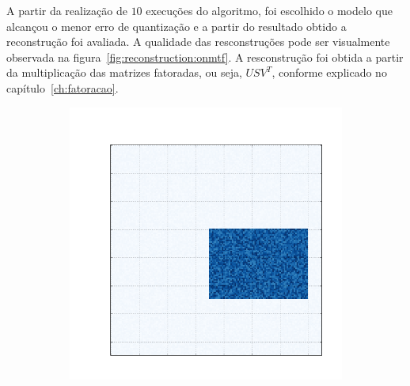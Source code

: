 \documentclass[
    12pt,                %
    oneside,            %
    a4paper,            %
    english,            %
    brazil                %
    ]{abntex2ppgsi}
\begin{document}
A partir da realização de $10$ execuções do algoritmo, foi escolhido o modelo que alcançou o menor erro de quantização e a partir do resultado obtido a reconstrução foi avaliada.
A qualidade das resconstruções pode ser visualmente observada na figura~\ref{fig:reconstruction:onmtf}.
A resconstrução foi obtida a partir da multiplicação das matrizes fatoradas, ou seja, $USV^T$, conforme explicado no capítulo~\ref{ch:fatoracao}.

\begin{figure}[H]
\centering
    \caption{
        As primeiras cinco matrizes são as matrizes originais, as demais são suas respectivas reconstruções, realizadas a partir dos resultados obtidos com o algoritmo \textit{ONMTF}.
    }
    \begin{subfigure}[b]{0.18\textwidth}
        \includegraphics[width=\textwidth]{img/a-bic-structure.png}
    \end{subfigure}
    \begin{subfigure}[b]{0.18\textwidth}

\end{subfigure}
\end{figure}
\end{document}

